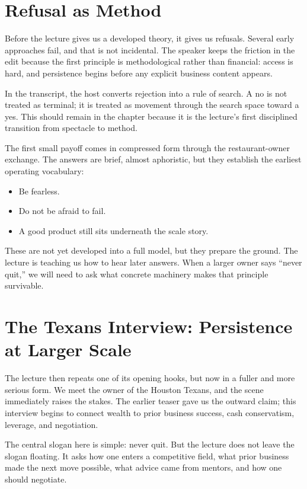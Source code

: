 \section{Refusal as Method}

Before the lecture gives us a developed theory, it gives us refusals. Several early approaches fail, and that is not incidental. The speaker keeps the friction in the edit because the first principle is methodological rather than financial: access is hard, and persistence begins before any explicit business content appears.

In the transcript, the host converts rejection into a rule of search. A no is not treated as terminal; it is treated as movement through the search space toward a yes. This should remain in the chapter because it is the lecture's first disciplined transition from spectacle to method.

The first small payoff comes in compressed form through the restaurant-owner exchange. The answers are brief, almost aphoristic, but they establish the earliest operating vocabulary:
\begin{itemize}
\item Be fearless.
\item Do not be afraid to fail.
\item A good product still sits underneath the scale story.
\end{itemize}
These are not yet developed into a full model, but they prepare the ground. The lecture is teaching us how to hear later answers. When a larger owner says ``never quit,'' we will need to ask what concrete machinery makes that principle survivable.

\section{The Texans Interview: Persistence at Larger Scale}

The lecture then repeats one of its opening hooks, but now in a fuller and more serious form. We meet the owner of the Houston Texans, and the scene immediately raises the stakes. The earlier teaser gave us the outward claim; this interview begins to connect wealth to prior business success, cash conservatism, leverage, and negotiation.

The central slogan here is simple: never quit. But the lecture does not leave the slogan floating. It asks how one enters a competitive field, what prior business made the next move possible, what advice came from mentors, and how one should negotiate.

